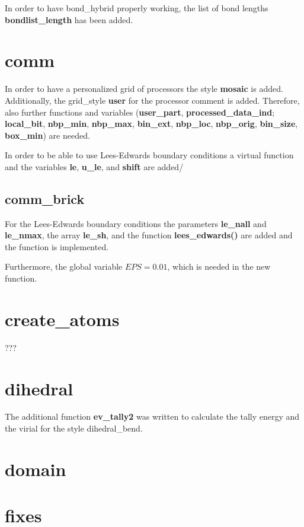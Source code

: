 \documentclass[a4paper,10pt]{scrreprt}
\begin{document}
In order to have bond\_hybrid properly working, the list of bond lengths \textbf{bondlist\_length} has been added.


\section{comm}

In order to have a personalized grid of processors the style \textbf{mosaic} is added.
Additionally, the grid\_style \textbf{user} for the processor comment is added.
Therefore, also further functions and variables (\textbf{user\_part}, \textbf{processed\_data\_ind}; \textbf{local\_bit}, \textbf{nbp\_min}, \textbf{nbp\_max}, \textbf{bin\_ext}, \textbf{nbp\_loc}, \textbf{nbp\_orig}, \textbf{bin\_size}, \textbf{box\_min}) are needed.

In order to be able to use Lees-Edwards boundary conditions a virtual function and the variables \textbf{le}, \textbf{u\_le}, and \textbf{shift} are added/

\subsection{comm\_brick}

For the Lees-Edwards boundary conditions the parameters \textbf{le\_nall} and \textbf{le\_nmax}, the array \textbf{le\_sh}, and the function \textbf{lees\_edwards()} are added and the function is implemented.

Furthermore, the global variable $EPS = 0.01$, which is needed in the new function.

\section{create\_atoms}

???

\section{dihedral}

The additional function \textbf{ev\_tally2} was written to calculate the tally energy and the virial for the style dihedral\_bend.


\section{domain}

\section{fixes}
\end{document}
